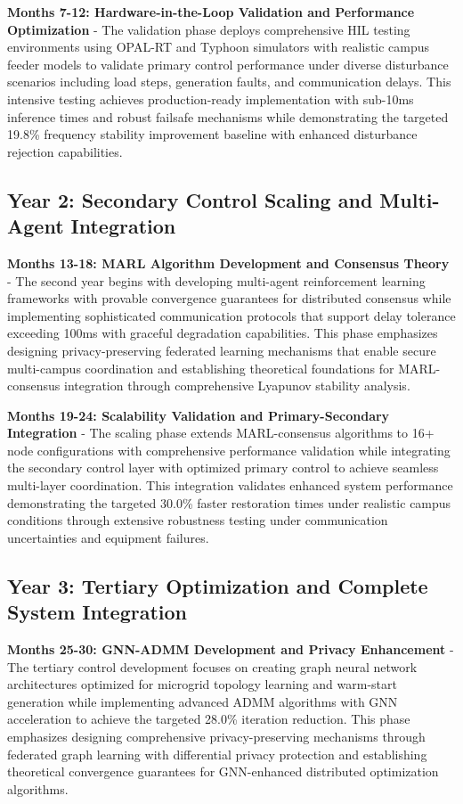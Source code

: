 \documentclass[12pt]{article}
\begin{document}
\textbf{Months 7-12: Hardware-in-the-Loop Validation and Performance Optimization} - The validation phase deploys comprehensive HIL testing environments using OPAL-RT and Typhoon simulators with realistic campus feeder models to validate primary control performance under diverse disturbance scenarios including load steps, generation faults, and communication delays. This intensive testing achieves production-ready implementation with sub-10ms inference times and robust failsafe mechanisms while demonstrating the targeted 19.8\% frequency stability improvement baseline with enhanced disturbance rejection capabilities.

\subsection{Year 2: Secondary Control Scaling and Multi-Agent Integration}

\textbf{Months 13-18: MARL Algorithm Development and Consensus Theory} - The second year begins with developing multi-agent reinforcement learning frameworks with provable convergence guarantees for distributed consensus while implementing sophisticated communication protocols that support delay tolerance exceeding 100ms with graceful degradation capabilities. This phase emphasizes designing privacy-preserving federated learning mechanisms that enable secure multi-campus coordination and establishing theoretical foundations for MARL-consensus integration through comprehensive Lyapunov stability analysis.

\textbf{Months 19-24: Scalability Validation and Primary-Secondary Integration} - The scaling phase extends MARL-consensus algorithms to 16+ node configurations with comprehensive performance validation while integrating the secondary control layer with optimized primary control to achieve seamless multi-layer coordination. This integration validates enhanced system performance demonstrating the targeted 30.0\% faster restoration times under realistic campus conditions through extensive robustness testing under communication uncertainties and equipment failures.

\subsection{Year 3: Tertiary Optimization and Complete System Integration}

\textbf{Months 25-30: GNN-ADMM Development and Privacy Enhancement} - The tertiary control development focuses on creating graph neural network architectures optimized for microgrid topology learning and warm-start generation while implementing advanced ADMM algorithms with GNN acceleration to achieve the targeted 28.0\% iteration reduction. This phase emphasizes designing comprehensive privacy-preserving mechanisms through federated graph learning with differential privacy protection and establishing theoretical convergence guarantees for GNN-enhanced distributed optimization algorithms.
\end{document}

